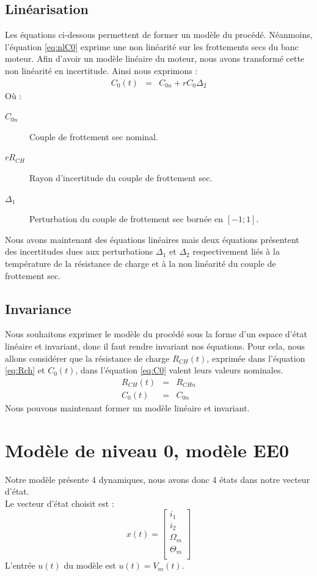 \subsection{Linéarisation}
Les équations ci-dessous permettent de former un modèle du procédé. Néanmoins, l'équation \ref{eq:nlC0} exprime une non linéarité sur les frottements secs du banc moteur. Afin d'avoir un modèle linéaire du moteur, nous avons transformé cette non linéarité en incertitude.
Ainsi nous exprimons : 
\begin{eqnarray}
\label{eq:C0} C_0(t) &=& C_{0n} + rC_0 \Delta_2
\end{eqnarray}
O\`u : 
\begin{description}
\item[$C_{0n}$] Couple de frottement sec nominal.
\item[$rR_{CH}$] Rayon d'incertitude du couple de frottement sec.
\item[$\Delta_1$] Perturbation du couple de frottement sec bornée en $[-1 ; 1]$.
\end{description}
Nous avons maintenant des équations linéaires mais deux équations présentent des incertitudes dues aux perturbations $\Delta_1$ et $ \Delta_2$ respectivement liés à la température de la résistance de charge et à la non linéarité du couple de frottement sec.
\subsection{Invariance}
Nous souhaitons exprimer le modèle du procédé sous la forme d'un espace d'état linéaire et invariant, donc il faut rendre invariant nos équations. Pour cela, nous allons considérer que la résistance de charge $R_{CH}(t)$, exprimée dans l'équation \ref{eq:Rch} et $C_0(t)$, dans l'équation \ref{eq:C0} valent leurs valeurs nominales. 
\begin{eqnarray}
R_{CH}(t) &=& R_{CHn} \\
C_0(t)    &=& C_{0n}
\end{eqnarray}
Nous pouvons maintenant former un modèle linéaire et invariant.
\section{Modèle de niveau 0, modèle EE0}
Notre modèle présente 4 dynamiques, nous avons donc 4 états dans notre vecteur d'état.\\

Le vecteur d'état choisit est :
\begin{equation}
x(t)=\begin{bmatrix}
i_1\\
i_2\\
\Omega_m\\
\Theta_m\\
\end{bmatrix}
\end{equation} 
L'entrée $u(t)$ du modèle est $u(t)=V_m(t)$.\\

